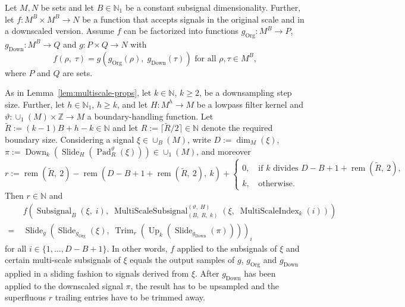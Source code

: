 \documentclass[journal]{IEEEtran}
\newcommand{\N}{\mathbb{N}}
\newcommand{\Z}{\mathbb{Z}}
\newcommand{\ROI}{B}
\newcommand{\discint}[2]{\{#1,\dotsc,#2\}}
\newcommand{\inint}[2]{\in\discint{#1}{#2}}
\newcommand{\bceil}[1]{\big\lceil #1 \big\rceil}
\DeclareMathOperator{\Subsignal}{Subsignal}
\DeclareMathOperator{\Slide}{Slide}
\DeclareMathOperator{\Trimming}{Trim}
\newcommand{\rem}[2]{\operatorname{rem}(#1,\ #2)}
\DeclareMathOperator{\Downsampling}{Down}
\DeclareMathOperator{\Upsampling}{Up}
\DeclareMathOperator{\Padding}{Pad}
\newcommand{\PaddingParams}{\Padding_R^\vartheta}
\DeclareMathOperator{\MultiScaleSubsignal}{MultiScaleSubsignal}
\newcommand{\MultiScaleSubsignalROIParams}{\MultiScaleSubsignal_{(\ROI,\; R,\; k)}^{(\vartheta,\; H)}}
\DeclareMathOperator{\MultiScaleIndex}{MultiScaleIndex}
\DeclareMathOperator{\Original}{Org}
\begin{document}
\begin{theorem}
\label{tmh:multiscale}
Let $M,N$ be sets and let $\ROI\in\N_1$ be a constant subsignal dimensionality.
Further, let $f\colon M^\ROI\times M^\ROI\to N$ be a function that accepts signals in the original scale and in a downscaled version.
Assume $f$ can be factorized into functions $g_{\Original}\colon M^\ROI\to P$, $g_{\Downsampling}\colon M^\ROI\to Q$ and $g\colon P\times Q\to N$ with
\begin{displaymath}
  f(\rho,\;\tau) = g(g_{\Original}(\rho),\;g_{\Downsampling}(\tau))\text{ for all }\rho,\tau\in M^\ROI\text{,}
\end{displaymath}
where $P$ and $Q$ are sets.

As in Lemma~\ref{lem:multiscale-props}, let $k\in\N$, $k \geq 2$, be a downsampling step size.
Further, let $h\in\N_1$, $h \geq k$, and let $H\colon M^h\to M$ be a lowpass filter kernel and $\vartheta\colon\cup_1(M)\times\Z\to M$ a boundary-handling function.
Let $\tilde{R} := (k - 1)\ROI + h - k\in\N$ and let $R := \bceil{\tilde{R} / 2}\in\N$ denote the required boundary size.
Considering a signal $\xi\in\cup_\ROI(M)$, write $D := \dim_M(\xi)$, $\pi := \Downsampling_k(\Slide_H(\PaddingParams(\xi)))\in\cup_1(M)$, and moreover
\begin{displaymath}
  r := \rem{\tilde{R}}{2} - \rem{D - \ROI + 1 + \rem{\tilde{R}}{2}}{k}
       + \begin{cases}
           0\text{,} & \text{if }k\text{ divides }D - \ROI + 1 + \rem{\tilde{R}}{2}\text{,}\\
           k\text{, } & \text{otherwise.}
         \end{cases}
\end{displaymath}
Then $r\in\N$ and
\begin{align*}
     & f\!\left(\Subsignal_\ROI(\xi,\;i),\; \MultiScaleSubsignalROIParams(\xi,\;\MultiScaleIndex_k(i))\right)\\
  =\ & \Slide_g\!\left(\Slide_{g_{\Original}}(\xi),\; \Trimming_{r}(\Upsampling_k(\Slide_{g_{\Downsampling}}(\pi)))\right)_i
\end{align*}
for all $i\inint{1}{D - \ROI + 1}$.
In other words, $f$ applied to the subsignals of $\xi$ and certain multi-scale subsignals of $\xi$ equals the output samples of $g$, $g_{\Original}$ and $g_{\Downsampling}$ applied in a sliding fashion to signals derived from $\xi$.
After $g_{\Downsampling}$ has been applied to the downscaled signal $\pi$, the result has to be upsampled and the superfluous $r$ trailing entries have to be trimmed away.

\end{theorem}
\end{document}
